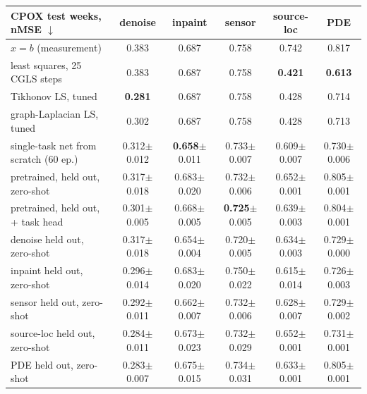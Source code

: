 \begin{tabular}{lccccc}
\toprule
CPOX test weeks, nMSE $\downarrow$ & denoise & inpaint & sensor & source-loc & PDE \\
\midrule
$x = b$ (measurement) & 0.383 & 0.687 & 0.758 & 0.742 & 0.817 \\
least squares, 25 CGLS steps & 0.383 & 0.687 & 0.758 & \textbf{0.421} & \textbf{0.613} \\
Tikhonov LS, tuned & \textbf{0.281} & 0.687 & 0.758 & 0.428 & 0.714 \\
graph-Laplacian LS, tuned & 0.302 & 0.687 & 0.758 & 0.428 & 0.713 \\
single-task net from scratch (60 ep.) & 0.312{\scriptsize$\pm$0.012} & \textbf{0.658}{\scriptsize$\pm$0.011} & 0.733{\scriptsize$\pm$0.007} & 0.609{\scriptsize$\pm$0.007} & 0.730{\scriptsize$\pm$0.006} \\
\midrule
pretrained, held out, zero-shot & 0.317{\scriptsize$\pm$0.018} & 0.683{\scriptsize$\pm$0.020} & 0.732{\scriptsize$\pm$0.006} & 0.652{\scriptsize$\pm$0.001} & 0.805{\scriptsize$\pm$0.001} \\
pretrained, held out, + task head & 0.301{\scriptsize$\pm$0.005} & 0.668{\scriptsize$\pm$0.005} & \textbf{0.725}{\scriptsize$\pm$0.005} & 0.639{\scriptsize$\pm$0.003} & 0.804{\scriptsize$\pm$0.001} \\
\midrule
denoise held out, zero-shot & \cellcolor{blue!10}0.317{\scriptsize$\pm$0.018} & 0.654{\scriptsize$\pm$0.004} & 0.720{\scriptsize$\pm$0.005} & 0.634{\scriptsize$\pm$0.003} & 0.729{\scriptsize$\pm$0.000} \\
inpaint held out, zero-shot & 0.296{\scriptsize$\pm$0.014} & \cellcolor{blue!10}0.683{\scriptsize$\pm$0.020} & 0.750{\scriptsize$\pm$0.022} & 0.615{\scriptsize$\pm$0.014} & 0.726{\scriptsize$\pm$0.003} \\
sensor held out, zero-shot & 0.292{\scriptsize$\pm$0.011} & 0.662{\scriptsize$\pm$0.007} & \cellcolor{blue!10}0.732{\scriptsize$\pm$0.006} & 0.628{\scriptsize$\pm$0.007} & 0.729{\scriptsize$\pm$0.002} \\
source-loc held out, zero-shot & 0.284{\scriptsize$\pm$0.011} & 0.673{\scriptsize$\pm$0.023} & 0.732{\scriptsize$\pm$0.029} & \cellcolor{blue!10}0.652{\scriptsize$\pm$0.001} & 0.731{\scriptsize$\pm$0.001} \\
PDE held out, zero-shot & 0.283{\scriptsize$\pm$0.007} & 0.675{\scriptsize$\pm$0.015} & 0.734{\scriptsize$\pm$0.031} & 0.633{\scriptsize$\pm$0.001} & \cellcolor{blue!10}0.805{\scriptsize$\pm$0.001} \\

\end{tabular}
